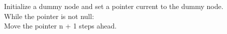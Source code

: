 \documentclass[preview]{standalone}
\begin{document}
Initialize a dummy node and set a pointer current to the dummy node.\\While the pointer is not null:\\Move the pointer n + 1 steps ahead.\\
\end{document}
